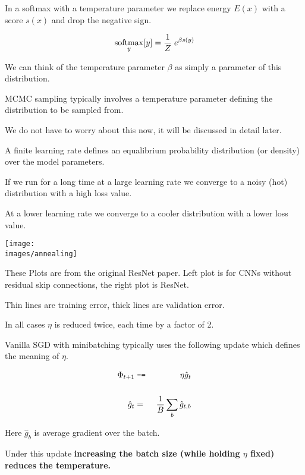{In a softmax with a temperature parameter we replace energy $E(x)$ with a score $s(x)$ and drop the negative sign.

$$\operatorname*{softmax}_y[y] = \frac{1}{Z}\;e^{\beta s(y)}$$

\vfill
We can think of the temperature parameter $\beta$ as simply a parameter of this distribution.


MCMC sampling typically involves a temperature parameter defining the distribution to be sampled from.

\vfill
We do not have to worry about this now, it will be discussed in detail later.


A finite learning rate defines an equalibrium probability distribution (or density) over the model parameters.

\vfill
If we run for a long time at a large learning rate we converge to a noisy (hot) distribution with a high loss value.

\vfill
At a lower learning rate we converge to a cooler distribution with a lower loss value.


\centerline{\texttt{[image: \\images/annealing]}}

\vfill
These Plots are from the original ResNet paper.  Left plot is for CNNs without residual skip connections, the right plot is ResNet.

\vfill
Thin lines are training error, thick lines are validation error.

\vfill
In all cases $\eta$ is reduced twice, each time by a factor of 2.


Vanilla SGD with minibatching typically uses the following update which defines the meaning of $\eta$.

\begin{eqnarray*}
\Phi_{t+1} & \;\mbox{\tt -=}\; & \eta \hat{g}_t \\
\\
\hat{g}_t & = & \frac{1}{B} \sum_b \hat{g}_{t,b}
\end{eqnarray*}

\vfill
Here $\hat{g}_{b}$ is average gradient over the batch.

\vfill
Under this update {\bf increasing the batch size (while holding $\eta$ fixed) reduces the temperature.}

}
